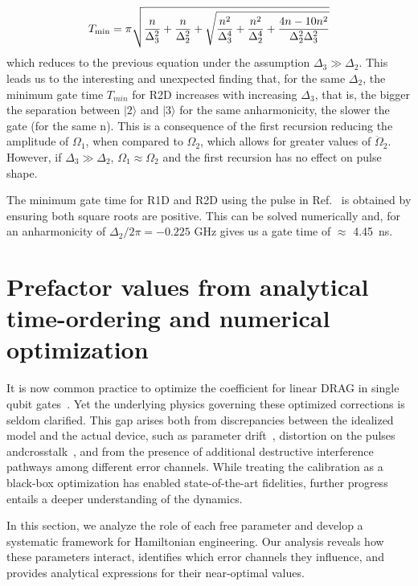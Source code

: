 \documentclass[superscriptaddress,amsmath,amssymb,aps,twocolumn,praplied,notitlepage]{revtex4-2}
\begin{document}
\begin{eqnarray}
    T_{{\rm{min}}}= \pi\sqrt{\frac{n}{\Delta_3^2}+\frac{n}{\Delta_2^2} +\sqrt{\frac{n^2}{\Delta_3^4}+\frac{n^2}{\Delta_2^4}+\frac{4n-10n^2}{\Delta_2^2\Delta_3^2}}}
\end{eqnarray}
which reduces to the previous equation under the assumption $\Delta_3 \gg \Delta_2$. This leads us to the interesting and unexpected finding that, for the same $\Delta_2$, the minimum gate time $T_{min}$ for R2D increases with increasing $\Delta_3$, that is, the bigger the separation between $|2\rangle$ and $|3\rangle$ for the same anharmonicity, the slower the gate {(for the same n). This is a consequence of the first recursion reducing the amplitude of $\Omega_1$, when compared to $\Omega_2$, which allows for greater values of $\ddot{\Omega}_2$.  However, if $\Delta_3 \gg \Delta_2$, $\Omega_1 \approx \Omega_2$ and the first recursion has no effect on pulse shape.}

The minimum gate time for R1D and R2D using the pulse in Ref.~\cite{li2024universal} is obtained by ensuring both square roots are positive. This can be solved numerically and, for an anharmonicity of $\Delta_{2}/2\pi=-0.225$ GHz gives us a gate time of $\approx$ 4.45~ns.


\section{Prefactor values from analytical time-ordering and numerical optimization}\label{Numerics}


It is now common practice to optimize the coefficient for linear DRAG in single qubit gates~\cite{PhysRevLett.116.020501, marxer2025999fidelitysinglequbitgates}.
Yet the underlying physics governing these optimized corrections is seldom clarified.
This gap arises both from discrepancies between the idealized model and the actual device, such as parameter drift~\cite{Burnettdriftt1t2,graaffcali,wudrift}, distortion on the pulses~\cite{PhysRevLett.110.040502,PhysRevApplied.21.064060} andcrosstalk~\cite{Wang2025Suppressinga}, and from the presence of additional destructive interference pathways among different error channels.
While treating the calibration as a black-box optimization has enabled state-of-the-art fidelities, further progress entails a deeper understanding of the dynamics.

In this section, we analyze the role of each free parameter and develop a systematic framework for Hamiltonian engineering. Our analysis reveals how these parameters interact, identifies which error channels they influence, and provides analytical expressions for their near-optimal values.
\end{document}
